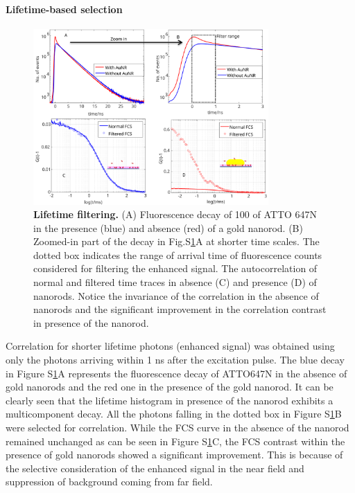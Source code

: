 \paragraph*{Lifetime-based selection}
\begin{figure}%
  \centering
  \includegraphics[width=0.8\textwidth]{lifetime_filtering}
  \makeatletter
  \renewcommand{\fnum@figure}{\figurename~S\thefigure}
  \makeatother{}
  \caption{\textbf{Lifetime filtering.} (A) Fluorescence decay of \SI{100}{\nM} of ATTO 647N in the presence (blue) and absence (red) of a gold nanorod.
  (B) Zoomed-in part of the decay in Fig.S\ref{SIfig:lifetime-filtering}A at shorter time scales. 
  The dotted box indicates the range of arrival time of fluorescence counts considered for filtering the enhanced signal.
  The autocorrelation of normal and filtered time traces in absence (C) and presence (D) of nanorods. 
  Notice the invariance of the correlation in the absence of nanorods and the significant improvement in the correlation contrast in presence of the nanorod.}
  \label{SIfig:lifetime-filtering}
\end{figure}

Correlation for shorter lifetime photons (enhanced signal) was obtained using only the photons arriving within 1 ns after the excitation pulse.
The blue decay in Figure S\ref{SIfig:lifetime-filtering}A represents the fluorescence decay of ATTO647N in the absence of gold nanorods and the red one in the presence of the gold nanorod. It can be clearly seen that the lifetime histogram in presence of the nanorod exhibits a multicomponent decay.
All the photons falling in the dotted box in Figure S\ref{SIfig:lifetime-filtering}B were selected for correlation.
While the FCS curve in the absence of the nanorod remained unchanged as can be seen in Figure S\ref{SIfig:lifetime-filtering}C, the FCS contrast within the presence of gold nanorods showed a significant improvement.
This is because of the selective consideration of the enhanced signal in the near field and suppression of background coming from far field.

